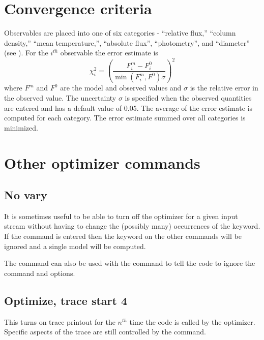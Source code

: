 \section{Convergence criteria}
\label{sec:conv:criteria}

Observables are placed into one of six categories - ``relative flux,''
``column density,'' ``mean temperature,'', ``absolute flux'', ``photometry'', and ``diameter''
(see \citealp{VanHoof1997}).
For the $i^{th}$ observable the error estimate is
\begin{equation}
\chi _i^2  = \left( {\frac{{F_i^m  - F_i^0 }}{{\min \left( {F_i^m ,F^0 }
\right)\sigma }}} \right)^2 %
\end{equation}
where $F^m$ and $F^0$ are the model and observed values
and $\sigma$ is the relative
error in the observed value.
The uncertainty $\sigma$ is specified when the
observed quantities are entered and has a default value of 0.05.
The average
of the error estimate is computed for each category.
The error estimate
summed over all categories is minimized.

\section{Other optimizer commands}

\subsection{No vary}

It is sometimes useful to be able to turn off the optimizer for a given
input stream without having to change the (possibly many) occurrences of
the  keyword.
If the  command is entered
then the  keyword
on the other commands will be ignored and a single model will be computed.

The  command can also be used with
the  command to tell the code to ignore the  command and 
options.

\subsection{Optimize, trace start 4}

This turns on trace printout for the $n^{th}$ time the
code is called by the
optimizer.
Specific aspects of the trace are still controlled by the
 command.

